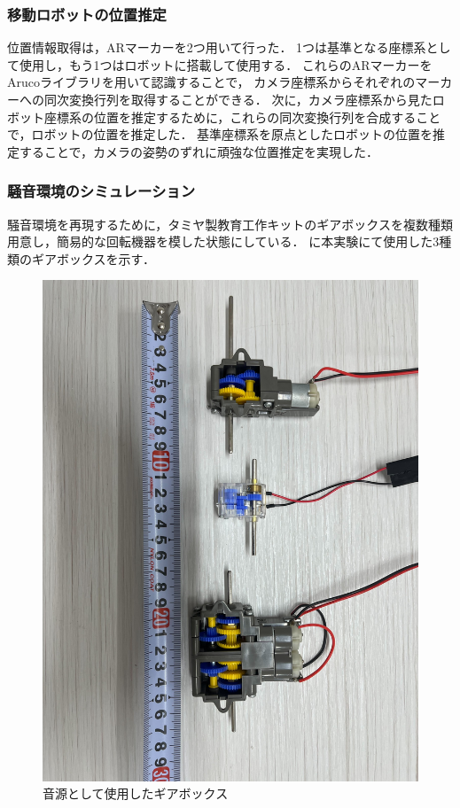 \documentclass[../main]{subfiles}
\begin{document}
\subsubsection{移動ロボットの位置推定}
位置情報取得は，ARマーカーを2つ用いて行った．
1つは基準となる座標系として使用し，もう1つはロボットに搭載して使用する．
これらのARマーカーをArucoライブラリを用いて認識することで，
カメラ座標系からそれぞれのマーカーへの同次変換行列を取得することができる\cite{aruco2014}．
次に，カメラ座標系から見たロボット座標系の位置を推定するために，これらの同次変換行列を合成することで，ロボットの位置を推定した．
基準座標系を原点としたロボットの位置を推定することで，カメラの姿勢のずれに頑強な位置推定を実現した．
\subsubsection{騒音環境のシミュレーション} \label{subsubsec:noise_simulation}
騒音環境を再現するために，タミヤ製教育工作キットのギアボックスを複数種類用意し，簡易的な回転機器を模した状態にしている．
に本実験にて使用した3種類のギアボックスを示す．


\begin{figure}[t]
  \centering
  \includegraphics[angle=90,keepaspectratio, width=0.7\linewidth]{chap4/gearbox.jpg}
  \caption{音源として使用したギアボックス}
  \label{fig:gearbox}
\end{figure}
\end{document}

